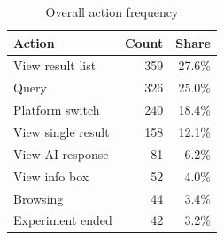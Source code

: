\begin{table}[t]
\centering
\caption{Overall action frequency}
\label{tab:rq1-overall-frequency}
\begin{tabular}{lrr}
\toprule
Action & Count & Share \\
\midrule
View result list & 359 & 27.6\% \\
Query & 326 & 25.0\% \\
Platform switch & 240 & 18.4\% \\
View single result & 158 & 12.1\% \\
View AI response & 81 & 6.2\% \\
View info box & 52 & 4.0\% \\
Browsing & 44 & 3.4\% \\
Experiment ended & 42 & 3.2\% \\
\bottomrule
\end{tabular}
\end{table}
